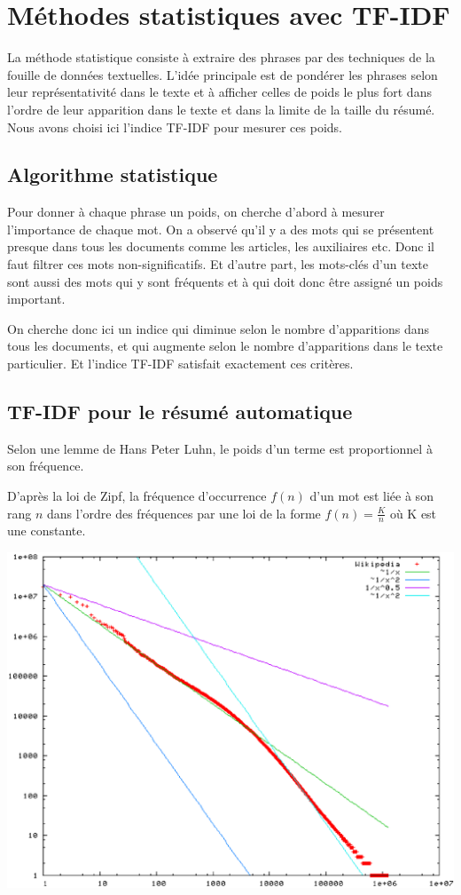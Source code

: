 \documentclass[a4paper, 12pt]{article}
\begin{document}
\section{Méthodes statistiques avec TF-IDF}\label{Partie:TF-IDF}

La méthode statistique consiste à extraire des phrases par des techniques de la fouille de données textuelles. L'idée principale est de pondérer les phrases selon leur représentativité dans le texte et à afficher celles de poids le plus fort dans l'ordre de leur apparition dans le texte et dans la limite de la taille du résumé. Nous avons choisi ici l'indice TF-IDF pour mesurer ces poids.

\subsection{Algorithme statistique}

Pour donner à chaque phrase un poids, on cherche d'abord à mesurer l'importance de chaque mot. On a observé qu'il y a des mots qui se présentent presque dans tous les documents comme les articles, les auxiliaires etc. Donc il faut filtrer ces mots non-significatifs. Et d'autre part, les mots-clés d'un texte sont aussi des mots qui y sont fréquents et à qui doit donc être assigné un poids important.

On cherche donc ici un indice qui diminue selon le nombre d'apparitions dans tous les documents, et qui augmente selon le nombre d'apparitions dans le texte particulier. Et l'indice TF-IDF satisfait exactement ces critères.


\subsection{TF-IDF pour le résumé automatique}
Selon une lemme de Hans Peter Luhn, le poids d'un terme est proportionnel à son fréquence.

D'après la loi de Zipf, la fréquence d'occurrence $f(n)$ d'un mot est liée à son rang $n$ dans l'ordre des fréquences par une loi de la forme $f(n) = \frac{K}{n} $ où K est une constante.

\includegraphics[scale=0.5]{loi_de_zipf.eps}
\end{document}
